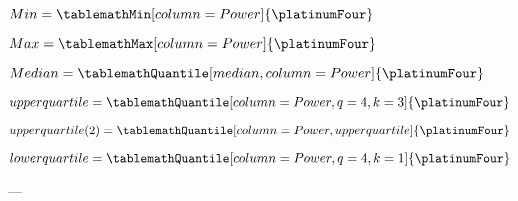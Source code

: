 \documentclass{article}
\begin{document}
    $Min = \tablemathMin[column=Power]{\platinumFour}$
    
    $Max = \tablemathMax[column=Power]{\platinumFour}$
    
    $Median = \tablemathQuantile[median,column=Power]{\platinumFour}$
   
    $upper quartile = \tablemathQuantile[column=Power,q=4,k=3]{\platinumFour}$

    $upper quartile(2) = \tablemathQuantile[column=Power, upper quartile]{\platinumFour}$

    $lower quartile = \tablemathQuantile[column=Power,q=4,k=1]{\platinumFour}$

    ---

    \pgfplotstabletypeset{\platinumFour}
\end{document}
